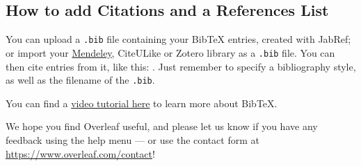 \subsection{How to add Citations and a References List}

You can upload a \verb|.bib| file containing your BibTeX entries, created with JabRef; or import your \href{https://www.overleaf.com/blog/184}{Mendeley}, CiteULike or Zotero library as a \verb|.bib| file. You can then cite entries from it, like this: \cite{greenwade93}. Just remember to specify a bibliography style, as well as the filename of the \verb|.bib|.

You can find a \href{https://www.overleaf.com/help/97-how-to-include-a-bibliography-using-bibtex}{video tutorial here} to learn more about BibTeX.

We hope you find Overleaf useful, and please let us know if you have any feedback using the help menu --- or use the contact form at \url{https://www.overleaf.com/contact}!
